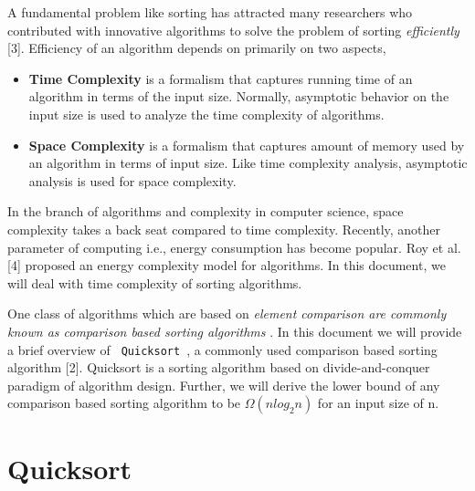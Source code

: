 \documentclass[letter,11pt,twocolumn]{article}
\begin{document}
A fundamental problem like sorting has attracted
many researchers who contributed with innovative
algorithms to solve the problem of sorting \textit{ efficiently } [3]. Efficiency of an algorithm depends on
primarily on two aspects,\\
\begin{itemize}
    \item \textbf{Time Complexity} is a formalism that captures running time of an algorithm in terms of the input size. Normally, { asymptotic } behavior
on the input size is used to analyze the time
complexity of algorithms.
   \item \textbf{Space Complexity} is a formalism that captures amount of memory used by an algorithm
in terms of input size. Like time complexity
analysis, asymptotic analysis is used for space
complexity.
\end{itemize}

In the branch of algorithms and complexity in computer science, space complexity takes a back seat
compared to time complexity. Recently, another
parameter of computing i.e., energy consumption
has become popular. Roy et al. [4] proposed an energy complexity model for algorithms. In this document, we will deal with time complexity of sorting
algorithms.

One class of algorithms which are based on \textit{ element comparison are commonly known as comparison based sorting algorithms }. In this document we will provide a brief overview of \texttt{ Quicksort }, a commonly
used comparison based sorting algorithm [2]. Quicksort
is a sorting algorithm based on divide-and-conquer
paradigm of algorithm design. Further,
we
will
derive the lower bound of any comparison
based
sorting algorithm to be $\Omega(nlog_2 n)$ for
an
input
size
of n.


\section{Quicksort}
\end{document}
